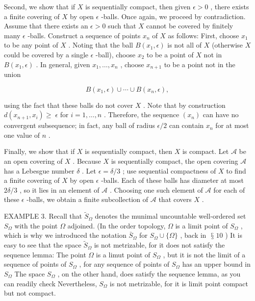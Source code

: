\documentclass[10pt]{article}
\begin{document}
Second, we show that if \(X\) is sequentially compact, then given \(\epsilon  > 0\) , there exists a finite covering of \(X\) by open \(\epsilon\) -balls. Once again, we proceed by contradiction. Assume that there exists an \(\epsilon  > 0\) such that \(X\) cannot be covered by finitely many \(\epsilon\) -balls. Construct a sequence of points \({x}_{n}\) of \(X\) as follows: First, choose \({x}_{1}\) to be any point of \(X\) . Noting that the ball \(B\left( {{x}_{1},\epsilon }\right)\) is not all of \(X\) (otherwise \(X\) could be covered by a single \(\epsilon\) -ball), choose \({x}_{2}\) to be a point of \(X\) not in \(B\left( {{x}_{1},\epsilon }\right)\) . In general, given \({x}_{1},\ldots ,{x}_{n}\) , choose \({x}_{n + 1}\) to be a point not in the union

\[
B\left( {{x}_{1},\epsilon }\right)  \cup  \cdots  \cup  B\left( {{x}_{n},\epsilon }\right) ,
\]

using the fact that these balls do not cover \(X\) . Note that by construction \(d\left( {{x}_{n + 1},{x}_{i}}\right)  \geq \; \epsilon\) for \(i = 1,\ldots ,n\) . Therefore, the sequence \(\left( {x}_{n}\right)\) can have no convergent subsequence; in fact, any ball of radius \(\epsilon /2\) can contain \({x}_{n}\) for at most one value of \(n\) .

Finally, we show that if \(X\) is sequentially compact, then \(X\) is compact. Let \(\mathcal{A}\) be an open covering of \(X\) . Because \(X\) is sequentially compact, the open covering \(\mathcal{A}\) has a Lebesgue number \(\delta\) . Let \(\epsilon  = \delta /3\) ; use sequential compactness of \(X\) to find a finite covering of \(X\) by open \(\epsilon\) -balls. Each of these balls has diameter at most \({2\delta }/3\) , so it lies in an element of \(\mathcal{A}\) . Choosing one such element of \(\mathcal{A}\) for each of these \(\epsilon\) -balls, we obtain a finite subcollection of \(\mathcal{A}\) that covers \(X\) .

EXAMPLE 3. Recall that \({\widetilde{S}}_{\Omega }\) denotes the munimal uncountable well-ordered set \({S}_{\Omega }\) with the point \(\Omega\) adjoined. (In the order topology, \(\Omega\) is a limit point of \({S}_{\Omega }\) , which is why we introduced the notation \({\bar{S}}_{\Omega }\) for \({S}_{\Omega } \cup  \{ \Omega \}\) , back in \(\text{ § }{10}\) ) It is easy to see that the space \({\widetilde{S}}_{\Omega }\) is not metrizable, for it does not satisfy the sequence lemma: The point \(\Omega\) is a limut point of \({S}_{\Omega }\) , but it is not the limit of a sequence of points of \({S}_{\Omega }\) , for any sequence of points of \({S}_{\Omega }\) has an upper bound in \({S}_{\Omega }\) The space \({S}_{\Omega }\) , on the other hand, does satisfy the sequence lemma, as you can readily check Nevertheless, \({S}_{\Omega }\) is not metrizable, for it is limit point compact but not compact.
\end{document}
